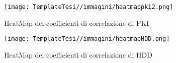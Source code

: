 
\begin{figure}[H]
    \centering
    \texttt{[image: TemplateTesi//immagini/heatmappki2.png]}
    \caption{HeatMap dei coefficienti di correlazione di PKI}
    \label{fig:corrPKI}
\end{figure}


\begin{figure}[H]
    \centering
    \texttt{[image: TemplateTesi//immagini/heatmapHDD.png]}
    \caption{HeatMap dei coefficienti di correlazione di HDD }
    \label{fig:corrHDD}
\end{figure}




